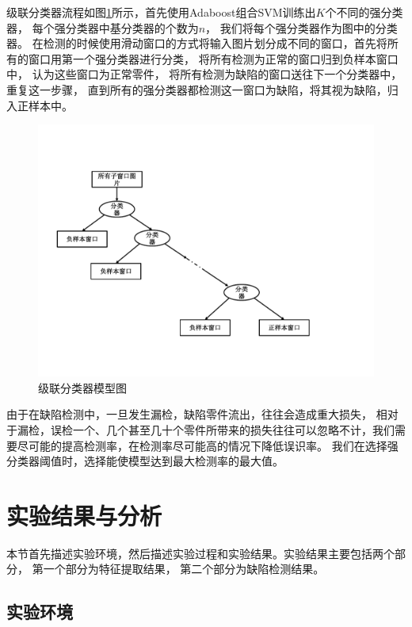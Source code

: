 级联分类器流程如图\ref{fig:cascade}所示，首先使用Adaboost组合SVM训练出$K$个不同的强分类器，
每个强分类器中基分类器的个数为$n$，
我们将每个强分类器作为图中的分类器。
在检测的时候使用滑动窗口的方式将输入图片划分成不同的窗口，首先将所有的窗口用第一个强分类器进行分类，
将所有检测为正常的窗口归到负样本窗口中，
认为这些窗口为正常零件，
将所有检测为缺陷的窗口送往下一个分类器中，
重复这一步骤，
直到所有的强分类器都检测这一窗口为缺陷，将其视为缺陷，归入正样本中。
\begin{figure}[htbp]
\centering
\includegraphics[width=1.0\linewidth]{figures/cascade.pdf}
\caption{级联分类器模型图}
\label{fig:cascade}
\end{figure}

由于在缺陷检测中，一旦发生漏检，缺陷零件流出，往往会造成重大损失，
相对于漏检，误检一个、几个甚至几十个零件所带来的损失往往可以忽略不计，我们需要尽可能的提高检测率，在检测率尽可能高的情况下降低误识率。
我们在选择强分类器阈值时，选择能使模型达到最大检测率的最大值。


\section{实验结果与分析}
\label{section:shiyanjieguo}

本节首先描述实验环境，然后描述实验过程和实验结果。实验结果主要包括两个部分，
第一个部分为特征提取结果，
第二个部分为缺陷检测结果。

\subsection{实验环境}

